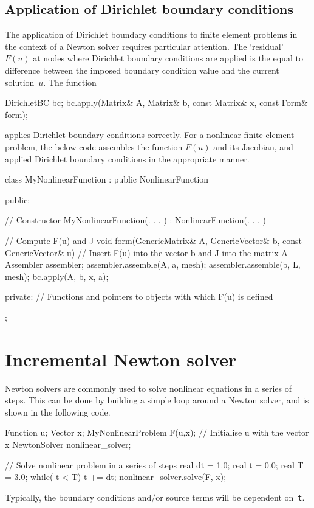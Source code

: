 \subsection{Application of Dirichlet boundary conditions}
%
The application of Dirichlet boundary conditions to finite element
problems in the context of a Newton solver requires particular 
attention. The `residual' $F(u)$ at nodes where Dirichlet boundary
conditions are applied is the equal to difference between the 
imposed boundary condition value and the current solution~$u$.
The function 
%
{\small
\begin{code}
DirichletBC bc;
bc.apply(Matrix& A, Matrix& b, const Matrix& x, const Form& form);
\end{code}
}
%
applies Dirichlet boundary conditions correctly. For a nonlinear
finite element problem, the below code assembles the function $F(u)$
and its Jacobian, and applied Dirichlet boundary conditions in the
appropriate manner.
%
\small
\begin{code}
class MyNonlinearFunction : public NonlinearFunction
{
public: 
  
  // Constructor 
  MyNonlinearFunction(. . . ) : NonlinearFunction(. . . ) {}
  
  // Compute F(u) and J 
  void form(GenericMatrix& A, GenericVector& b, 
            const GenericVector& u)
  {
    // Insert F(u) into the vector b and J into the matrix A 
    Assembler assembler;
    assembler.assemble(A, a, mesh);
    assembler.assemble(b, L, mesh);
    bc.apply(A, b, x, a);
  }

private:
  // Functions and pointers to objects with which F(u) is defined
};
\end{code}
\normalsize
\section{Incremental Newton solver}
%
Newton solvers are commonly used to solve nonlinear equations in a series 
of steps. This can be done by building a simple loop around a Newton solver,
and is shown in the following code.
%
{
\begin{code}
Function u;
Vector x;
MyNonlinearProblem F(u,x); // Initialise u with the vector x
NewtonSolver nonlinear_solver;

// Solve nonlinear problem in a series of steps
real dt = 1.0; real t  = 0.0; real T  = 3.0;
while( t < T)
{
  t += dt;
  nonlinear_solver.solve(F, x);
}
\end{code}
}
%
Typically, the boundary conditions and/or source terms will be dependent 
on~\texttt{t}.

